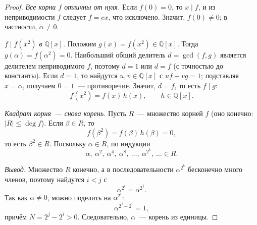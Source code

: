 \documentclass[12pt]{article}
\begin{document}
	\begin{proof}
		\emph{Все корни $f$ отличны от нуля.} Если $f(0)=0$, то
		$x\mid f$, и из неприводимости $f$ следует $f=cx$, что исключено.
		Значит, $f(0)\ne0$; в частности, $\alpha\ne0$.

		\emph{$f\mid f(x^2)$ в $\mathbb{Q}[x]$.} Положим
		$g(x)=f(x^2)\in\mathbb{Q}[x]$. Тогда $g(\alpha)=f(\alpha^2)=0$.
		Наибольший общий делитель $d=\gcd(f,g)$ является делителем
		неприводимого $f$, поэтому $d=1$ или $d=f$ (с точностью до
		константы). Если $d=1$, то найдутся $u,v\in\mathbb{Q}[x]$ с
		$uf+vg=1$; подставляя $x=\alpha$, получаем $0=1$~--- противоречие.
		Значит, $d=f$, то есть $f\mid g$:
		\[
			f(x^2)=f(x)\,h(x),\qquad h\in\mathbb{Q}[x].
		\]

		\emph{Квадрат корня~--- снова корень.} Пусть $R$~--- множество
		корней $f$ (оно конечно: $|R|\leqslant\deg f$). Если $\beta\in R$, то
		\[
			f(\beta^2)=f(\beta)\,h(\beta)=0,
		\]
		то есть $\beta^2\in R$. Поскольку $\alpha\in R$, по индукции
		\[
			\alpha,\ \alpha^2,\ \alpha^4,\ \alpha^8,\ \ldots,\ \alpha^{2^k},\ \ldots\in R.
		\]

		\emph{Вывод.} Множество $R$ конечно, а в последовательности
		$\alpha^{2^k}$ бесконечно много членов, поэтому найдутся $i<j$ с
		\[
			\alpha^{2^i}=\alpha^{2^j}.
		\]
		Так как $\alpha\ne0$, можно поделить на $\alpha^{2^i}$:
		\[
			\alpha^{2^j-2^i}=1,
		\]
		причём $N=2^j-2^i>0$. Следовательно, $\alpha$~--- корень из единицы.
	\end{proof}
\end{document}

